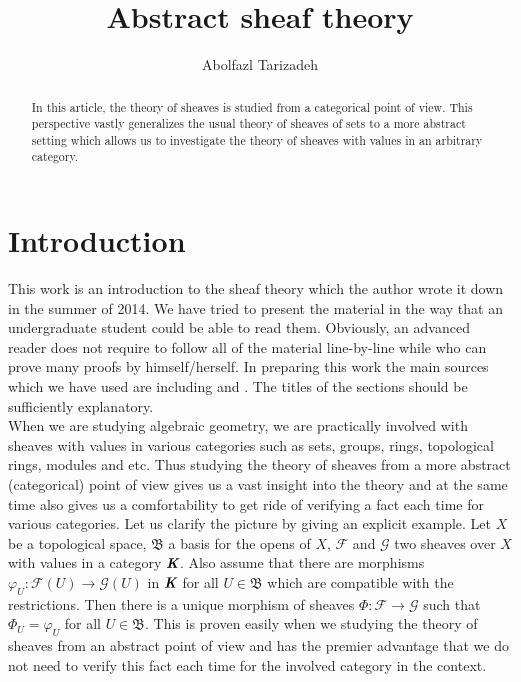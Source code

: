 \documentclass[12pt]{amsart}
\renewcommand{\phi}{\varphi}
\theoremstyle{definition}
\begin{document}
\title{Abstract sheaf theory}



\author{Abolfazl Tarizadeh}
\address{Department of Mathematics, Faculty of Basic Sciences, University of Maragheh \\
P. O. Box 55181-83111, Maragheh, Iran.
 }

\date{}



\begin{abstract} In this article, the theory of sheaves is studied from a categorical point of view. This perspective vastly generalizes the usual theory of sheaves of sets to a more abstract setting which allows us to investigate the theory of sheaves with values in an arbitrary category.
\end{abstract}


\maketitle

\section{Introduction}

This work is an introduction to the sheaf theory which the author wrote it down in the summer of 2014. We have tried to present the material in the way that an undergraduate student could be able to read them. Obviously, an advanced reader does not require to follow all of the material line-by-line while who can prove many proofs by himself/herself. In preparing this work the main sources which we have used are including \cite{Grothendieck} and \cite{Johan}. The titles of the sections should be sufficiently explanatory.\\

When we are studying algebraic geometry, we are practically involved with sheaves with values in various categories such as sets, groups, rings, topological rings, modules and etc. Thus studying the theory of sheaves from a more abstract (categorical) point of view gives us a vast insight into the theory and at the same time also gives us a comfortability to get ride of verifying a fact each time for various categories. Let us clarify the picture by giving an explicit example. Let $X$ be a topological space, $\mathfrak{B}$ a basis for the opens of $X$, $\mathscr{F}$ and $\mathscr{G}$ two sheaves over $X$ with values in a category $\emph{\textbf{K}}$. Also assume that there are morphisms $\phi_{U}:\mathscr{F}(U)\rightarrow\mathscr{G}(U)$ in $\emph{\textbf{K}}$ for all $U\in\mathfrak{B}$ which are compatible with the restrictions. Then there is a unique morphism of sheaves $\Phi:\mathscr{F}\rightarrow\mathscr{G}$ such that $\Phi_{U}=\phi_{U}$ for
all $U\in\mathfrak{B}$. This is proven easily when we studying the theory of sheaves from an abstract point of view and has the premier advantage that we do not need to verify this fact each time for the involved category in the context.
\end{document}
